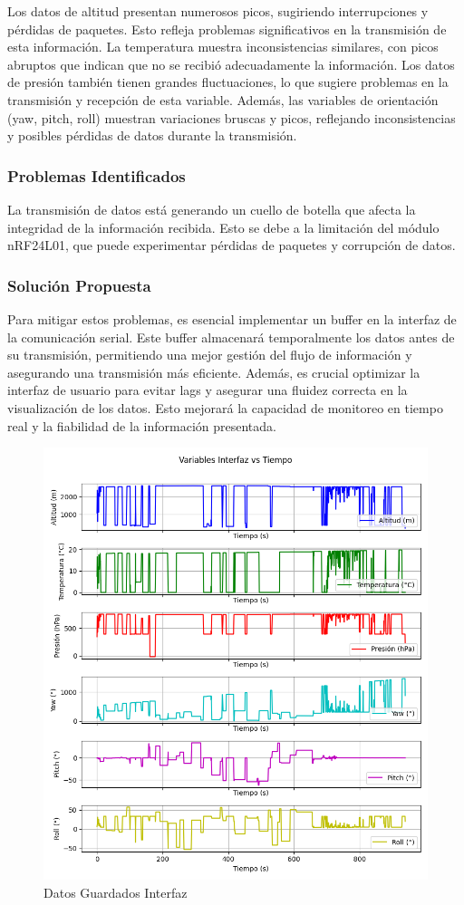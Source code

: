         Los datos de altitud presentan numerosos picos, sugiriendo interrupciones y pérdidas de paquetes. Esto refleja problemas significativos en la transmisión de esta información. La temperatura muestra inconsistencias similares, con picos abruptos que indican que no se recibió adecuadamente la información. Los datos de presión también tienen grandes fluctuaciones, lo que sugiere problemas en la transmisión y recepción de esta variable. Además, las variables de orientación (yaw, pitch, roll) muestran variaciones bruscas y picos, reflejando inconsistencias y posibles pérdidas de datos durante la transmisión.

    \subsubsection{Problemas Identificados}
        La transmisión de datos está generando un cuello de botella que afecta la integridad de la información recibida. Esto se debe a la limitación del módulo nRF24L01, que puede experimentar pérdidas de paquetes y corrupción de datos.

    \subsubsection{Solución Propuesta}
        Para mitigar estos problemas, es esencial implementar un buffer en la interfaz de la comunicación serial. Este buffer almacenará temporalmente los datos antes de su transmisión, permitiendo una mejor gestión del flujo de información y asegurando una transmisión más eficiente. Además, es crucial optimizar la interfaz de usuario para evitar lags y asegurar una fluidez correcta en la visualización de los datos. Esto mejorará la capacidad de monitoreo en tiempo real y la fiabilidad de la información presentada.

    \begin{figure}[H]
        \centering
        \includegraphics[width=\textwidth]{Imagenes/Vuelo/subplots_interfaz.png}
        \caption{Datos Guardados Interfaz}
        \label{fig:Datos guardados Interfaz}
    \end{figure}